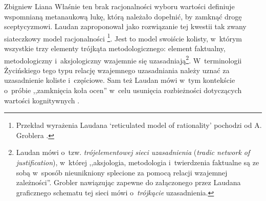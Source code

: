 \begin{artplenv}{Zbigniew Liana}
Właśnie ten brak racjonalności wyboru wartości definiuje wspomnianą metanaukową lukę, którą należało dopełnić, by zamknąć drogę sceptycyzmowi. Laudan zaproponował jako rozwiązanie tej kwestii tak zwany siateczkowy model racjonalności
\parencites[][s.~62–66]{laudan_science_1984}[][s.~20n]{grobler_prawda_1993}%
\footnote{Przekład wyrażenia Laudana ‘reticulated model of rationality' pochodzi od A. Groblera 
\parencite*[][]{grobler_prawda_1993}.%
}. Jest to model swoiście kolisty, w~którym wszystkie trzy elementy trójkąta metodologicznego: element faktualny, metodologiczny i~aksjologiczny wzajemnie się uzasadniają\footnote{Laudan 
\parencite*[][s.~63]{laudan_science_1984} %
 mówi o~tzw. \textit{trójelementowej sieci uzasadnienia} (\textit{tradic network of justification}), w~której ,,aksjologia, metodologia i~twierdzenia faktualne są ze sobą w~sposób nieunikniony splecione za pomocą relacji wzajemnej zależności''. Grobler 
\parencite*[][s.~21]{grobler_prawda_1993} %
 nawiązując zapewne do załączonego przez Laudana graficznego schematu tej sieci mówi o~\textit{trójkącie} uzasadnienia.}. W~terminologii Życińskiego tego typu relację wzajemnego uzasadniania należy uznać za uzasadnienie koliste i~częściowe. Sam też Laudan mówi w~tym kontekście o~próbie ,,zamknięcia koła ocen'' w~celu usunięcia rozbieżności dotyczących wartości kognitywnych 
\parencite[][s.~42]{laudan_science_1984}.%



\end{artplenv}
